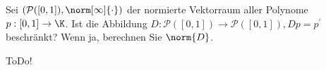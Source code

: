 
\begin{exercise}

Sei $(\mathcal{P}([0, 1]), \norm[\infty]{\cdot})$ der normierte Vektorraum aller Polynome $p: [0, 1] \to \K$.
Ist die Abbildung $D: \mathcal{P}([0, 1]) \to \mathcal{P}([0, 1]), Dp = p^\prime$ beschränkt?
Wenn ja, berechnen Sie $\norm{D}$.

\end{exercise}


\begin{solution}

ToDo!

\end{solution}

